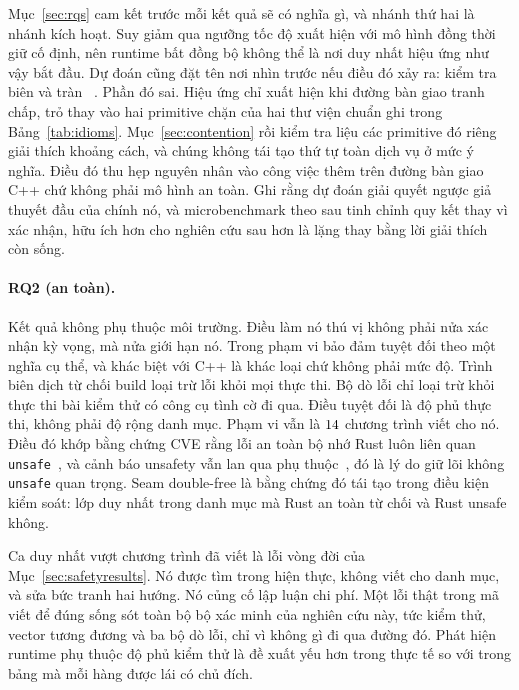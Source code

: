 Mục~\ref{sec:rqs}
cam kết trước mỗi kết quả sẽ có nghĩa gì, và nhánh thứ hai là nhánh
kích hoạt. Suy giảm qua ngưỡng tốc độ xuất hiện với mô hình đồng thời giữ cố định, nên
runtime bất đồng bộ không thể là nơi duy nhất hiệu ứng như vậy bắt đầu. Dự đoán cũng
đặt tên nơi nhìn trước nếu điều đó xảy ra: kiểm tra biên và tràn
~\cite{zhang2022runtime,harris2023morello}. Phần đó sai. Hiệu ứng
chỉ xuất hiện khi đường bàn giao tranh chấp, trỏ thay vào hai primitive chặn của
hai thư viện chuẩn ghi trong Bảng~\ref{tab:idioms}. Mục~\ref{sec:contention}
rồi kiểm tra liệu các primitive đó riêng giải thích khoảng cách, và chúng không tái tạo
thứ tự toàn dịch vụ ở mức ý nghĩa. Điều đó thu hẹp nguyên nhân vào công việc thêm trên đường bàn giao C++
chứ không phải mô hình an toàn. Ghi rằng dự đoán giải quyết ngược giả thuyết đầu
của chính nó, và microbenchmark theo sau tinh chỉnh quy kết thay vì xác nhận,
hữu ích hơn cho nghiên cứu sau hơn là lặng thay bằng lời giải thích còn sống.

\paragraph{RQ2 (an toàn).} Kết quả không phụ thuộc môi trường. Điều làm nó
thú vị không phải nửa xác nhận kỳ vọng, mà nửa giới hạn nó. Trong
phạm vi bảo đảm tuyệt đối theo một nghĩa cụ thể, và khác biệt với C++ là khác
loại chứ không phải mức độ. Trình biên dịch từ chối build loại trừ lỗi khỏi
mọi thực thi. Bộ dò lỗi chỉ loại trừ khỏi thực thi bài kiểm thử có công cụ
tình cờ đi qua. Điều tuyệt đối là độ phủ thực thi, không phải độ rộng danh mục.
Phạm vi vẫn là $14$ chương trình viết cho nó.
Điều đó khớp bằng chứng CVE rằng lỗi an toàn bộ nhớ Rust luôn liên quan
\texttt{unsafe}~\cite{xu2021rustcve}, và cảnh báo unsafety vẫn lan
qua phụ thuộc~\cite{evans2020rust}, đó là lý do giữ lõi không \texttt{unsafe}
quan trọng. Seam double-free là bằng chứng đó tái tạo trong điều kiện kiểm soát: lớp
duy nhất trong danh mục mà Rust an toàn từ chối và Rust unsafe không.

Ca duy nhất vượt chương trình đã viết là lỗi vòng đời của
Mục~\ref{sec:safetyresults}. Nó được tìm trong hiện thực, không viết cho
danh mục, và sửa bức tranh hai hướng. Nó củng cố lập luận
chi phí. Một lỗi thật trong mã viết để đúng sống sót toàn bộ bộ xác minh
của nghiên cứu này, tức kiểm thử, vector tương đương và ba bộ dò lỗi, chỉ vì
không gì đi qua đường đó. Phát hiện runtime phụ thuộc độ phủ kiểm thử là đề xuất
yếu hơn trong thực tế so với trong bảng mà mỗi hàng được lái có chủ đích.

